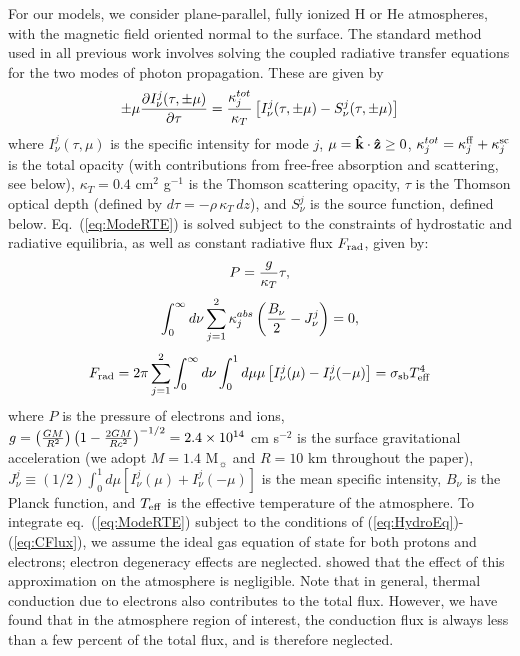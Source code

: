 \documentclass[useAMS,onecolumn,usenatbib,usegraphicx]{mn2e}
\begin{document}
For our models, we consider plane-parallel, fully ionized H or He atmospheres, with the 
magnetic field oriented normal to the surface.  The standard method used in all previous work
involves solving the coupled radiative transfer equations for the two modes of photon propagation.  
These are given by
\begin{eqnarray}
\label{eq:ModeRTE}
\pm\mu{\partial I^j_{\nu}(\tau,\pm\mu)\over \partial\tau}={\kappa^{tot}_j\over \kappa_T}
\left[I^j_{\nu}(\tau,\pm\mu)-S^j_{\nu}(\tau,\pm\mu)\right]
\end{eqnarray}
where $I^j_{\nu}(\tau,\mu)$ is the specific intensity for mode $j$, 
$\mu={\bf\hat{k}}\cdot{\bf\hat{z}}\ge 0$,
$\kappa^{tot}_j=\kappa_j^{\rm ff}+\kappa_j^{\rm sc}$ is the 
total opacity (with contributions from free-free absorption and scattering, see below), 
$\kappa_T=0.4$ cm$^2$ g$^{-1}$ is the Thomson 
scattering opacity, $\tau$ is the Thomson optical depth (defined by $d\tau=-\rho\,\kappa_T\,dz$), 
and $S^j_{\nu}$ is the source function, defined below.  Eq.~(\ref{eq:ModeRTE}) is solved subject to the 
constraints of hydrostatic and radiative equilibria, as well as constant radiative flux $F_{\rm rad}$, given by:
\begin{eqnarray}
\label{eq:HydroEq}
P = {g\over\kappa_T}\tau,
\end{eqnarray}
\begin{eqnarray}
\label{eq:RadEq1}
\int_0^{\infty} d\nu\sum_{j=1}^2\kappa^{abs}_j\left({B_{\nu}\over 2}-J^j_{\nu}\right)=0,
\end{eqnarray}
\begin{eqnarray}
\label{eq:CFlux}
F_{\rm rad} = 2\pi\sum_{j=1}^2\int_0^{\infty}d\nu\int_0^1d\mu \mu\left[I_{\nu}^j(\mu)-I_{\nu}^j(-\mu)\right]
=\sigma_{\rm sb} T_{\rm eff}^4
\end{eqnarray}
where $P$ is the pressure of electrons and ions, $g = \left({GM\over R^2}\right)\left(1-{2GM\over Rc^2}\right)^{-1/2} 
= 2.4\times 10^{14}$ cm s$^{-2}$ is the 
surface gravitational acceleration (we adopt $M=1.4$ M$_{\sun}$ and $R=10$ km throughout the paper), 
$J^j_{\nu}\equiv (1/2)\int_0^1 d\mu \left[I^j_{\nu}(\mu)+I^j_{\nu}(-\mu)\right]$ is the mean specific intensity, 
$B_{\nu}$ is the Planck function, 
and $T_{\rm eff}$ is the effective temperature of the atmosphere.
To integrate eq.~(\ref{eq:ModeRTE}) subject to 
the conditions of (\ref{eq:HydroEq})-(\ref{eq:CFlux}), we assume the ideal gas equation of state for both 
protons and electrons; electron degeneracy effects are neglected.  \citet[][]{HoLai01a} showed that 
the effect of this approximation on the atmosphere is negligible.
Note that in general, thermal conduction due to electrons also contributes to the total flux.  However, 
we have found that in the atmosphere region of interest, the conduction flux is always less than a 
few percent of the total flux, and is therefore neglected.
\end{document}
